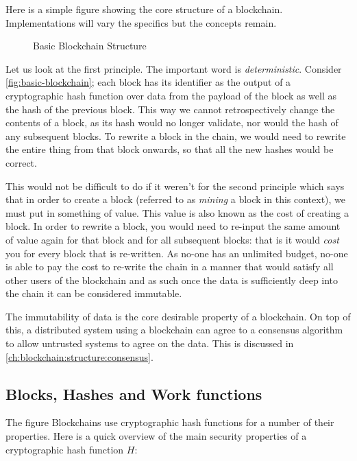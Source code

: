 Here is a simple figure showing the core structure of a blockchain. Implementations will vary the specifics but the concepts remain.

\begin{figure}
    \centering
    
    \caption{Basic Blockchain Structure}
    \label{fig:basic-blockchain}
\end{figure}

Let us look at the first principle. The important word is \emph{deterministic}. Consider \autoref{fig:basic-blockchain}; each block has its identifier as the output of a cryptographic hash function over data from the payload of the block as well as the hash of the previous block. This way we cannot retrospectively change the contents of a block, as its hash would no longer validate, nor would the hash of any subsequent blocks. To rewrite a block in the chain, we would need to rewrite the entire thing from that block onwards, so that all the new hashes would be correct.

This would not be difficult to do if it weren't for the second principle which says that in order to create a block (referred to as \emph{mining} a block in this context), we must put in something of value. This value is also known as the cost of creating a block. In order to rewrite a block, you would need to re-input the same amount of value again for that block and for all subsequent blocks: that is it would \emph{cost} you for every block that is re-written. As no-one has an unlimited budget, no-one is able to pay the cost to re-write the chain in a manner that would satisfy all other users of the blockchain and as such once the data is sufficiently deep into the chain it can be considered immutable.

The immutability of data is the core desirable property of a blockchain. On top of this, a distributed system using a blockchain can agree to a consensus algorithm to allow untrusted systems to agree on the data. This is discussed in \autoref{ch:blockchain:structure:consensus}.

\subsection{Blocks, Hashes and Work functions}
\label{ch:blockchain:structure:basics}

The figure Blockchains use cryptographic hash functions for a number of their properties. Here is a quick overview of the main security properties of a cryptographic hash function $H$:

